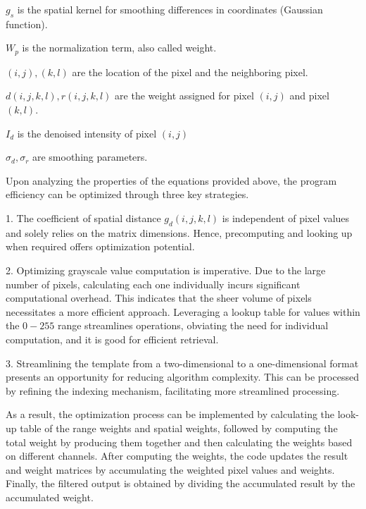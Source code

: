 \documentclass[a4paper, 12pt]{article}
\begin{document}
\hspace{2em}$g_s$ is the spatial kernel for smoothing differences in coordinates (Gaussian function).

\hspace{2em}$W_{p}$ is the normalization term, also called weight.

\hspace{2em}$(i, j), (k, l)$ are the location of the pixel and the neighboring pixel.

\hspace{2em}$d(i, j, k, l), r(i, j, k, l)$ are the weight assigned for pixel $(i, j)$ and pixel $(k, l)$.

\hspace{2em}$I_d$ is the denoised intensity of pixel $(i, j)$

\hspace{2em}$\sigma_d, \sigma_r$ are smoothing parameters.

\vspace{1em}

Upon analyzing the properties of the equations provided above, the program efficiency can be optimized through three key strategies.

1. The coefficient of spatial distance $g_d(i, j, k, l)$ is independent of pixel values and solely relies on the matrix dimensions. Hence, precomputing and looking up when required offers optimization potential. \cite{5872028}

2. Optimizing grayscale value computation is imperative. Due to the large number of pixels, calculating each one individually incurs significant computational overhead. This indicates that the sheer volume of pixels necessitates a more efficient approach. Leveraging a lookup table for values within the $0-255$ range streamlines operations, obviating the need for individual computation, and it is good for efficient retrieval.

3. Streamlining the template from a two-dimensional to a one-dimensional format presents an opportunity for reducing algorithm complexity. This can be processed by refining the indexing mechanism, facilitating more streamlined processing.

\vspace{1em}

As a result, the optimization process can be implemented by calculating the look-up table of the range weights and spatial weights, followed by computing the total weight by producing them together and then calculating the weights based on different channels. After computing the weights, the code updates the result and weight matrices by accumulating the weighted pixel values and weights. Finally, the filtered output is obtained by dividing the accumulated result by the accumulated weight.
\end{document}
